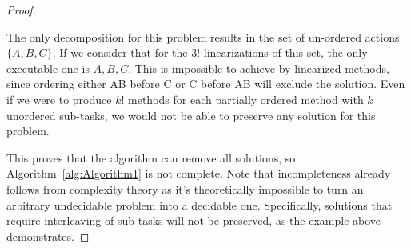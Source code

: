 \begin{proof}
\begin{figure}
{\begin{subfigure}{7cm}
			\end{subfigure}	
		}
	\end{figure}
	
	\begin{figure}
	\end{figure}
	
	The only decomposition for this problem results in the set of un-ordered actions $\{A, B, C\}$.
	If we consider that for the $3!$ linearizations of this set, the only executable one is $A, B, C$. This is impossible to achieve by linearized methods, since ordering either AB before C or C before AB will exclude the solution. 
	Even if we were to produce $k!$ methods for each partially ordered method with $k$ unordered sub-tasks, we would not be able to preserve any solution for this problem.
	
	This proves that the algorithm can remove all solutions, so Algorithm~\ref{alg:Algorithm1} is not complete. Note that incompleteness already follows from complexity theory as it's theoretically impossible to turn an arbitrary undecidable problem into a decidable one.
	Specifically, solutions that require interleaving of sub-tasks will not be preserved, as the example above demonstrates.
	
\end{proof}


